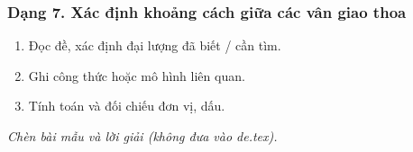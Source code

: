\subsubsection{Dạng 7. Xác định khoảng cách giữa các vân giao thoa}
\begin{phuongphap}
\begin{enumerate}
\item Đọc đề, xác định đại lượng đã biết / cần tìm.
\item Ghi công thức hoặc mô hình liên quan.
\item Tính toán và đối chiếu đơn vị, dấu.
\end{enumerate}
\end{phuongphap}
\begin{vidumau}
\textit{Chèn bài mẫu và lời giải (không đưa vào de.tex).}
\end{vidumau}

